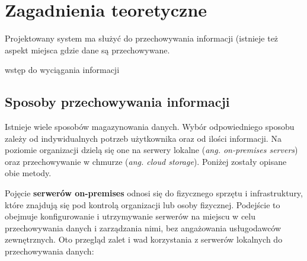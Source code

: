 \documentclass[12pt,a4paper,twoside]{article}
\begin{document}
\section{Zagadnienia teoretyczne}
Projektowany system ma służyć do przechowywania informacji (istnieje też aspekt miejsca gdzie dane są przechowywane. \par
wstęp do wyciągania informacji
\subsection{Sposoby przechowywania informacji}
Istnieje wiele sposobów magazynowania danych. Wybór odpowiedniego sposobu zależy od indywidualnych potrzeb użytkownika oraz od ilości informacji. Na poziomie organizacji dzielą się one na serwery lokalne (\textit{ang. on-premises servers}) oraz przechowywanie w chmurze (\textit{ang. cloud storage}). Poniżej zostały opisane obie metody.\par
Pojęcie \textbf{serwerów on-premises} odnosi się do fizycznego sprzętu i infrastruktury, które znajdują się pod kontrolą organizacji lub osoby fizycznej. Podejście to obejmuje konfigurowanie i utrzymywanie serwerów na miejscu w celu przechowywania danych i zarządzania nimi, bez angażowania usługodawców zewnętrznych. Oto przegląd zalet i wad korzystania z serwerów lokalnych do przechowywania danych:
\end{document}
